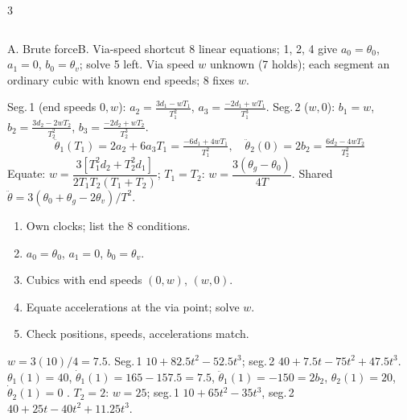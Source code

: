 \begin{multicols}{3}
\begin{fbx}[8 conditions]
\begin{tabularx}{\linewidth}{@{}rXrX@{}}
\end{tabularx}
\end{fbx}
\begin{twoway}{A. Brute force}{B. Via-speed shortcut}
8 linear equations; 1, 2, 4 give $a_0=\theta_0$, $a_1=0$, $b_0=\theta_v$; solve 5 left.
\tcblower
Via speed $w$ unknown (7 holds); each segment an ordinary cubic with known end speeds; 8 fixes $w$.
\end{twoway}
\begin{deriv}[via speed $w$; $d_1=\theta_v-\theta_0$, $d_2=\theta_g-\theta_v$]
Seg.\,1 (end speeds $0,w$): $a_2=\frac{3d_1-wT_1}{T_1^2}$, $a_3=\frac{-2d_1+wT_1}{T_1^3}$. Seg.\,2 ($w,0$): $b_1=w$, $b_2=\frac{3d_2-2wT_2}{T_2^2}$, $b_3=\frac{-2d_2+wT_2}{T_2^3}$.
\[\ddot\theta_1(T_1)=2a_2+6a_3T_1=\tfrac{-6d_1+4wT_1}{T_1^2},\quad \ddot\theta_2(0)=2b_2=\tfrac{6d_2-4wT_2}{T_2^2}\]
Equate: $\boxed{w=\dfrac{3[T_1^2d_2+T_2^2d_1]}{2T_1T_2(T_1+T_2)}}$; $T_1=T_2$: $\boxed{w=\dfrac{3(\theta_g-\theta_0)}{4T}}$. Shared $\ddot\theta=3(\theta_0+\theta_g-2\theta_v)/T^2$. \chk
\end{deriv}
\begin{recipe}
\begin{enumerate}
\item Own clocks; list the 8 conditions.
\item $a_0=\theta_0$, $a_1=0$, $b_0=\theta_v$.
\item Cubics with end speeds $(0,w)$, $(w,0)$.
\item Equate accelerations at the via point; solve $w$.
\item Check positions, speeds, accelerations match.
\end{enumerate}
\end{recipe}
\begin{worked}[$\theta=10^\circ,40^\circ,20^\circ$, $T_1=T_2=1$\,s]
$w=3(10)/4=7.5$. Seg.\,1 $10+82.5t^2-52.5t^3$; seg.\,2 $40+7.5t-75t^2+47.5t^3$. $\theta_1(1)=40$, $\dot\theta_1(1)=165-157.5=7.5$, $\ddot\theta_1(1)=-150=2b_2$, $\theta_2(1)=20$, $\dot\theta_2(1)=0$ \checkmark. $T_2=2$: $w=25$; seg.\,1 $10+65t^2-35t^3$, seg.\,2 $40+25t-40t^2+11.25t^3$. \chk
\end{worked}


\end{multicols}
